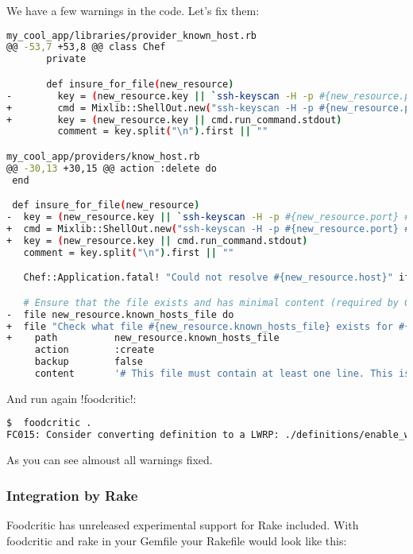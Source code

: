 We have a few warnings in the code. Let's fix them:

\begin{lstlisting}[language=Bash,label=lst:testing-foodcritic3]
my_cool_app/libraries/provider_known_host.rb
@@ -53,7 +53,8 @@ class Chef
       private

       def insure_for_file(new_resource)
-        key = (new_resource.key || `ssh-keyscan -H -p #{new_resource.port} #{new_resource.host} 2>&1`)
+        cmd = Mixlib::ShellOut.new("ssh-keyscan -H -p #{new_resource.port} #{new_resource.host} 2>&1")
+        key = (new_resource.key || cmd.run_command.stdout)
         comment = key.split("\n").first || ""

my_cool_app/providers/know_host.rb
@@ -30,13 +30,15 @@ action :delete do
 end

 def insure_for_file(new_resource)
-  key = (new_resource.key || `ssh-keyscan -H -p #{new_resource.port} #{new_resource.host} 2>&1`)
+  cmd = Mixlib::ShellOut.new("ssh-keyscan -H -p #{new_resource.port} #{new_resource.host} 2>&1")
+  key = (new_resource.key || cmd.run_command.stdout)
   comment = key.split("\n").first || ""

   Chef::Application.fatal! "Could not resolve #{new_resource.host}" if key =~ /getaddrinfo/

   # Ensure that the file exists and has minimal content (required by Chef::Util::FileEdit)
-  file new_resource.known_hosts_file do
+  file "Check what file #{new_resource.known_hosts_file} exists for #{new_resource.name}" do
+    path          new_resource.known_hosts_file
     action        :create
     backup        false
     content       '# This file must contain at least one line. This is that line.'
\end{lstlisting}

And run again \inline!foodcritic!:

\begin{lstlisting}[language=Bash,label=lst:testing-foodcritic4]
$  foodcritic .
FC015: Consider converting definition to a LWRP: ./definitions/enable_web_site.rb:1
\end{lstlisting}

As you can see almoust all warnings fixed.

\subsubsection{Integration by Rake}

Foodcritic has unreleased experimental support for Rake included. With foodcritic and rake in your Gemfile your Rakefile would look like this:

